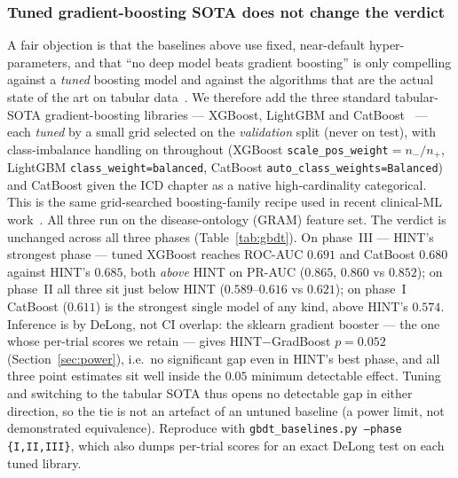 \documentclass[a4paper,fleqn]{cas-sc}
\begin{document}
\subsubsection{Tuned gradient-boosting SOTA does not change the verdict}
\label{sec:gbdt}
A fair objection is that the baselines above use fixed, near-default hyper-parameters, and
that ``no deep model beats gradient boosting'' is only compelling against a \emph{tuned}
boosting model and against the algorithms that are the actual state of the art on tabular
data~\citep{bentejac2019comparative}. We therefore add the three standard tabular-SOTA
gradient-boosting libraries --- XGBoost, LightGBM and CatBoost~\citep{prokhorenkova2018catboost}
--- each \emph{tuned} by a small grid selected on the \emph{validation} split (never on test),
with class-imbalance handling on throughout (XGBoost \texttt{scale\_pos\_weight}$=n_-/n_+$,
LightGBM \texttt{class\_weight=balanced}, CatBoost \texttt{auto\_class\_weights=Balanced}) and
CatBoost given the ICD chapter as a native high-cardinality categorical. This is the same
grid-searched boosting-family recipe used in recent clinical-ML work~\citep{sun2025explainable}. All
three run on the disease-ontology (GRAM) feature set.
The verdict is unchanged across all three phases (Table~\ref{tab:gbdt}). On phase~III ---
HINT's strongest phase --- tuned XGBoost reaches ROC-AUC $0.691$ and CatBoost $0.680$ against
HINT's $0.685$, both \emph{above} HINT on PR-AUC ($0.865$, $0.860$ vs $0.852$); on phase~II all
three sit just below HINT ($0.589$--$0.616$ vs $0.621$); on phase~I CatBoost ($0.611$) is the
strongest single model of any kind, above HINT's $0.574$. Inference is by DeLong, not
CI overlap: the sklearn gradient booster --- the one whose per-trial scores we retain --- gives
HINT$-$GradBoost $p=0.052$ (Section~\ref{sec:power}), i.e.\ no significant gap even in HINT's
best phase, and all three point estimates sit well inside the $0.05$ minimum detectable effect.
Tuning and switching to the tabular SOTA thus opens no detectable gap in either direction, so
the tie is not an artefact of an untuned baseline (a power limit, not demonstrated equivalence).
Reproduce with \texttt{gbdt\_baselines.py --phase \{I,II,III\}}, which also dumps per-trial
scores for an exact DeLong test on each tuned library.
\end{document}
